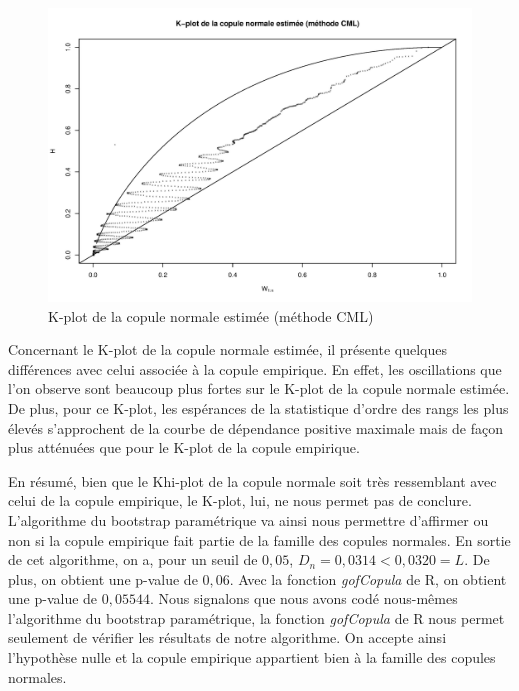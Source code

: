 \noindent%
\begin{figure}[H]
    \begin{center}
      \includegraphics[width=17 cm, angle=0]{./pictures/normalcmlkplot.png}
      \centering\caption{\label{2}K-plot de la copule normale estimée (méthode CML)}
    \end{center}
\end{figure}

Concernant le K-plot de la copule normale estimée, il présente quelques différences avec celui associée à la copule empirique. En effet, les oscillations que l'on observe sont beaucoup plus fortes sur le K-plot de la copule normale estimée. De plus, pour ce K-plot, les espérances de la statistique d'ordre des rangs les plus élevés s'approchent de la courbe de dépendance positive maximale mais de façon plus atténuées que pour le K-plot de la copule empirique.

En résumé, bien que le Khi-plot de la copule normale soit très ressemblant avec celui de la copule empirique, le K-plot, lui, ne nous permet pas de conclure. L'algorithme du bootstrap paramétrique va ainsi nous permettre d'affirmer ou non si la copule empirique fait partie de la famille des copules normales. En sortie de cet algorithme, on a, pour un seuil de $0,05$, $D_n = 0,0314 < 0,0320 = L$. De plus, on obtient une p-value de $0,06$. Avec la fonction \textit{gofCopula} de R, on obtient une p-value de $0,05544$. 
Nous signalons que nous avons codé nous-mêmes l'algorithme du bootstrap paramétrique, la fonction \textit{gofCopula} de R nous permet seulement de vérifier les résultats de notre algorithme. 
On accepte ainsi l'hypothèse nulle et la copule empirique appartient bien à la famille des copules normales.


